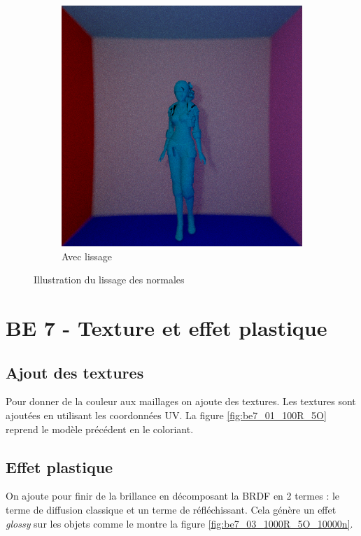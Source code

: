 \documentclass[12pt,a4paper,twoside]{report}
\begin{document}
\begin{figure}[H]
\begin{subfigure}{.45\textwidth}
		\includegraphics[width=1.\linewidth]{be6_02_100R_5O}
		\caption{Avec lissage}
		\label{fig:be6_02_100R_5O}
	\end{subfigure}
	\caption{Illustration du lissage des normales}
\end{figure}

\newpage\section{BE 7 - Texture et effet plastique}

\subsection{Ajout des textures}

Pour donner de la couleur aux maillages on ajoute des textures. Les textures sont ajoutées en utilisant les coordonnées UV. La figure \ref{fig:be7_01_100R_5O} reprend le modèle précédent en le coloriant.

\subsection{Effet plastique}

On ajoute pour finir de la brillance en décomposant la BRDF en 2 termes : le terme de diffusion classique et un terme de réfléchissant. Cela génère un effet \emph{glossy} sur les objets comme le montre la figure \ref{fig:be7_03_1000R_5O_10000n}.
\end{document}
